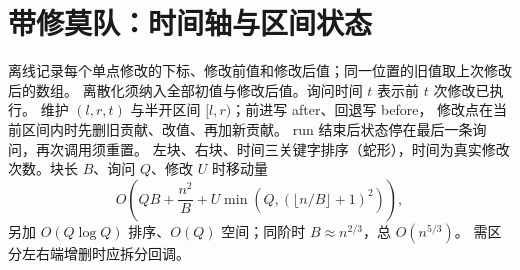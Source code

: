 \section{带修莫队：时间轴与区间状态}\label{knowledge-mo-time}
离线记录每个单点修改的下标、修改前值和修改后值；同一位置的旧值取上次修改后的数组。
离散化须纳入全部初值与修改后值。询问时间 $t$ 表示前 $t$ 次修改已执行。
维护 $(l,r,t)$ 与半开区间 $[l,r)$；前进写 after、回退写 before，
修改点在当前区间内时先删旧贡献、改值、再加新贡献。
run 结束后状态停在最后一条询问，再次调用须重置。
左块、右块、时间三关键字排序（蛇形），时间为真实修改次数。块长 $B$、询问 $Q$、修改 $U$ 时移动量
\[
O\left(QB+\frac{n^2}{B}+U\min\left(Q,(\lfloor n/B\rfloor+1)^2\right)\right),
\]
另加 $O(Q\log Q)$ 排序、$O(Q)$ 空间；同阶时 $B\approx n^{2/3}$，总 $O(n^{5/3})$。
需区分左右端增删时应拆分回调。
